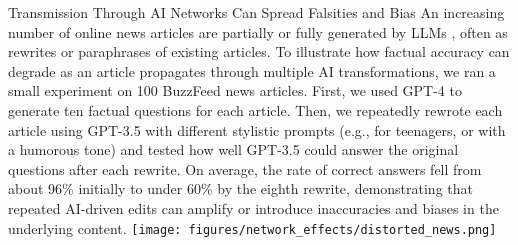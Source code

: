 \begin{case-study}[label=cs:news_corruption,sidebyside,sidebyside align=top,lower separated=false]{Transmission Through AI Networks Can Spread Falsities and Bias}
    An increasing number of online news articles are partially or fully generated by LLMs \citep{Sadeghi2023}, often as rewrites or paraphrases of existing articles.
    To illustrate how factual accuracy can degrade as an article propagates through multiple AI transformations, we ran a small experiment on 100 BuzzFeed news articles. First, we used GPT-4 to generate ten factual questions for each article. Then, we repeatedly rewrote each article using GPT-3.5 with different stylistic prompts (e.g., for teenagers, or with a humorous tone) and tested how well GPT-3.5 could answer the original questions after each rewrite. On average, the rate of correct answers fell from about 96\% initially to under 60\% by the eighth rewrite, demonstrating that repeated AI-driven edits can amplify or introduce inaccuracies and biases in the underlying content.\footnotemark{}
    \tcblower
    \texttt{[image: figures/network\_effects/distorted\_news.png]}
    \label{fig:distorted_news}
\end{case-study}



